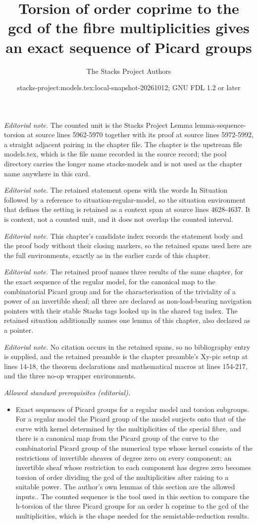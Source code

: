 \documentclass[10pt,a4paper]{amsart}
\title{Torsion of order coprime to the gcd of the fibre multiplicities gives an exact sequence of Picard groups}
\author{The Stacks Project Authors}
\date{stacks-project:models.tex:local-snapshot-20261012; GNU FDL 1.2 or later}
\theoremstyle{plain}
\theoremstyle{definition}
\theoremstyle{remark}
\numberwithin{equation}{subsection}
\begin{document}
\maketitle
\noindent\textit{Editorial note.} The counted unit is the Stacks Project Lemma lemma-sequence-torsion at source lines 5962-5970 together with its proof at source lines 5972-5992, a straight adjacent pairing in the chapter file. The chapter is the upstream file models.tex, which is the file name recorded in the source record; the pool directory carries the longer name stacks-models and is not used as the chapter name anywhere in this card.\par\medskip
\noindent\textit{Editorial note.} The retained statement opens with the words In Situation followed by a reference to situation-regular-model, so the situation environment that defines the setting is retained as a context span at source lines 4628-4637. It is context, not a counted unit, and it does not overlap the counted interval.\par\medskip
\noindent\textit{Editorial note.} This chapter's candidate index records the statement body and the proof body without their closing markers, so the retained spans used here are the full environments, exactly as in the earlier cards of this chapter.\par\medskip
\noindent\textit{Editorial note.} The retained proof names three results of the same chapter, for the exact sequence of the regular model, for the canonical map to the combinatorial Picard group and for the characterisation of the triviality of a power of an invertible sheaf; all three are declared as non-load-bearing navigation pointers with their stable Stacks tags looked up in the shared tag index. The retained situation additionally names one lemma of this chapter, also declared as a pointer.\par\medskip
\noindent\textit{Editorial note.} No citation occurs in the retained spans, so no bibliography entry is supplied, and the retained preamble is the chapter preamble's Xy-pic setup at lines 14-18, the theorem declarations and mathematical macros at lines 154-217, and the three no-op wrapper environments.\par\medskip
\noindent\textit{Allowed standard prerequisites (editorial).}\begin{itemize}
\item Exact sequences of Picard groups for a regular model and torsion subgroups. For a regular model the Picard group of the model surjects onto that of the curve with kernel determined by the multiplicities of the special fibre, and there is a canonical map from the Picard group of the curve to the combinatorial Picard group of the numerical type whose kernel consists of the restrictions of invertible sheaves of degree zero on every component; an invertible sheaf whose restriction to each component has degree zero becomes torsion of order dividing the gcd of the multiplicities after raising to a suitable power. The author's own lemmas of this section are the allowed inputs.. The counted sequence is the tool used in this section to compare the h-torsion of the three Picard groups for an order h coprime to the gcd of the multiplicities, which is the shape needed for the semistable-reduction results.
\end{itemize}\medskip
\end{document}
